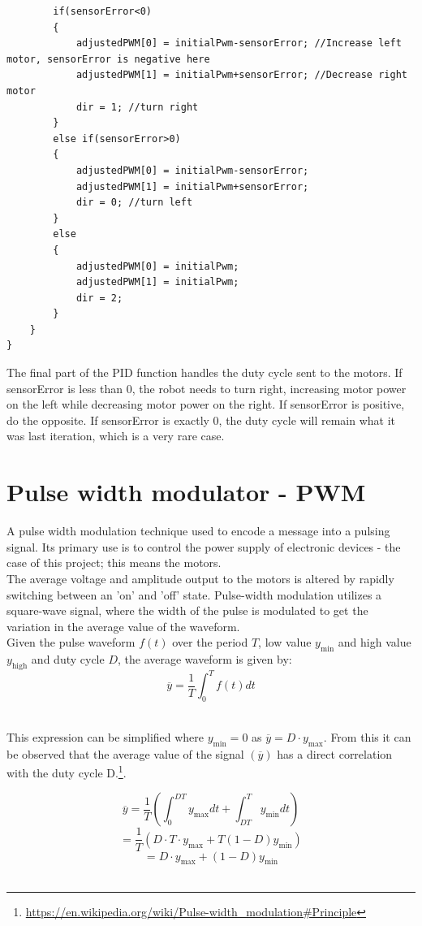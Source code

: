 \begin{lstlisting}
		if(sensorError<0)
		{
			adjustedPWM[0] = initialPwm-sensorError; //Increase left motor, sensorError is negative here
			adjustedPWM[1] = initialPwm+sensorError; //Decrease right motor
			dir = 1; //turn right
		}
		else if(sensorError>0)
		{
			adjustedPWM[0] = initialPwm-sensorError;
			adjustedPWM[1] = initialPwm+sensorError; 
			dir = 0; //turn left
		}
		else
		{
			adjustedPWM[0] = initialPwm;
			adjustedPWM[1] = initialPwm;
			dir = 2;
		}
	}
}
\end{lstlisting}
The final part of the PID function handles the duty cycle sent to the motors. If sensorError is less than 0, the robot needs to turn right, increasing motor power on the left while decreasing motor power on the right. If sensorError is positive, do the opposite. If sensorError is exactly 0, the duty cycle will remain what it was last iteration, which is a very rare case.

\section{Pulse width modulator - PWM}

A pulse width modulation technique used to encode a message into a pulsing signal. Its primary use is to control the power supply of electronic devices - the case of this project; this means the motors.\\
The average voltage and amplitude output to the motors is altered by rapidly switching between an 'on' and 'off' state.
Pulse-width modulation utilizes a square-wave signal, where the width of the pulse is modulated to get the variation in the average value of the waveform.\\ Given the pulse waveform $f(t)$ over the period $T$, low value $y_\mathrm{min}$ and high value $y_\mathrm{high}$ and duty cycle $D$, the average waveform is given by: \\

$$\overline{y}=\frac{1}{T}\int_{0}^{T}f(t)dt$$\

This expression can be simplified where $y_\mathrm{min}=0$ as $\overline{y}=D \cdot y_\mathrm{max}$. From this it can be observed that the average value of the signal $(\overline{y})$ has a direct correlation with the duty cycle D.\footnote{\url{https://en.wikipedia.org/wiki/Pulse-width_modulation\#Principle}}.
 
 $$\overline{y}=\frac{1}{T}\left(\int_{0}^{DT}y_\mathrm{max}dt+\int_{DT}^{T}y_\mathrm{min}dt\right)$$
 $$=\frac{1}{T}\left(D \cdot T \cdot y_\mathrm{max}+T(1-D)y_\mathrm{min}\right)$$
 $$=D \cdot y_\mathrm{max}+\left(1-D\right)y_\mathrm{min}$$\
  
